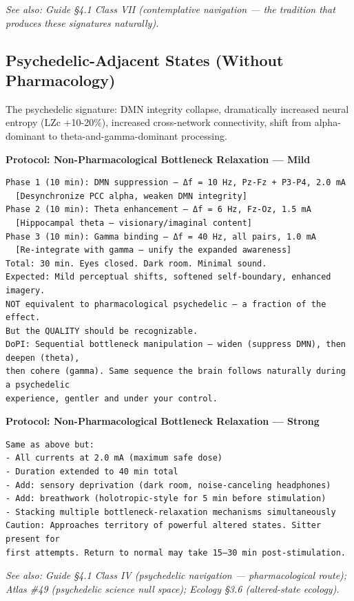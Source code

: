 \textit{See also: Guide §4.1 Class VII (contemplative navigation — the tradition that produces these signatures naturally).}


\subsection*{Psychedelic-Adjacent States (Without Pharmacology)}


The psychedelic signature: DMN integrity collapse, dramatically increased neural entropy (LZc +10-20\%), increased cross-network connectivity, shift from alpha-dominant to theta-and-gamma-dominant processing.


\textbf{Protocol: Non-Pharmacological Bottleneck Relaxation — Mild}

\begin{verbatim}
Phase 1 (10 min): DMN suppression — Δf = 10 Hz, Pz-Fz + P3-P4, 2.0 mA
  [Desynchronize PCC alpha, weaken DMN integrity]
Phase 2 (10 min): Theta enhancement — Δf = 6 Hz, Fz-Oz, 1.5 mA
  [Hippocampal theta — visionary/imaginal content]
Phase 3 (10 min): Gamma binding — Δf = 40 Hz, all pairs, 1.0 mA
  [Re-integrate with gamma — unify the expanded awareness]
Total: 30 min. Eyes closed. Dark room. Minimal sound.
Expected: Mild perceptual shifts, softened self-boundary, enhanced imagery. 
NOT equivalent to pharmacological psychedelic — a fraction of the effect. 
But the QUALITY should be recognizable.
DoPI: Sequential bottleneck manipulation — widen (suppress DMN), then deepen (theta), 
then cohere (gamma). Same sequence the brain follows naturally during a psychedelic 
experience, gentler and under your control.
\end{verbatim}


\textbf{Protocol: Non-Pharmacological Bottleneck Relaxation — Strong}

\begin{verbatim}
Same as above but:
- All currents at 2.0 mA (maximum safe dose)
- Duration extended to 40 min total
- Add: sensory deprivation (dark room, noise-canceling headphones)
- Add: breathwork (holotropic-style for 5 min before stimulation)
- Stacking multiple bottleneck-relaxation mechanisms simultaneously
Caution: Approaches territory of powerful altered states. Sitter present for 
first attempts. Return to normal may take 15–30 min post-stimulation.
\end{verbatim}


\textit{See also: Guide §4.1 Class IV (psychedelic navigation — pharmacological route); Atlas \#49 (psychedelic science null space); Ecology §3.6 (altered-state ecology).}


